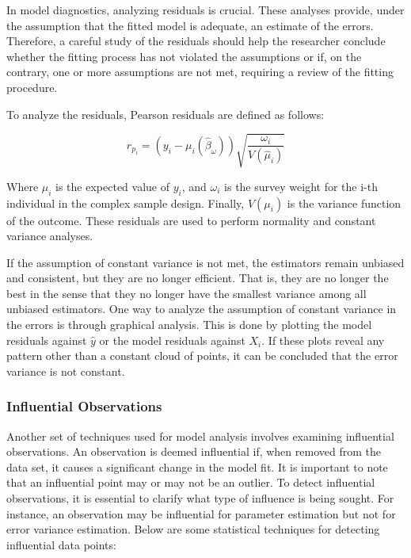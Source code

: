 \documentclass[
  12pt,
]{book}
\begin{document}
In model diagnostics, analyzing residuals is crucial. These analyses provide, under the assumption that the fitted model is adequate, an estimate of the errors. Therefore, a careful study of the residuals should help the researcher conclude whether the fitting process has not violated the assumptions or if, on the contrary, one or more assumptions are not met, requiring a review of the fitting procedure.

To analyze the residuals, Pearson residuals \citep{Heeringa_West_Berglund_2017} are defined as follows:

\[
r_{p_{i}}  =  \left(y_{i}-\mu_{i}\left(\hat{\beta}_{\omega}\right)\right)\sqrt{\frac{\omega_{i}}{V\left(\hat{\mu}_{i}\right)}}
\]

Where \(\mu_{i}\) is the expected value of \(y_{i}\), and \(\omega_{i}\) is the survey weight for the i-th individual in the complex sample design. Finally, \(V(\mu_{i})\) is the variance function of the outcome. These residuals are used to perform normality and constant variance analyses.

If the assumption of constant variance is not met, the estimators remain unbiased and consistent, but they are no longer efficient. That is, they are no longer the best in the sense that they no longer have the smallest variance among all unbiased estimators. One way to analyze the assumption of constant variance in the errors is through graphical analysis. This is done by plotting the model residuals against \(\hat{y}\) or the model residuals against \(X_{i}\). If these plots reveal any pattern other than a constant cloud of points, it can be concluded that the error variance is not constant.

\hypertarget{influential-observations}{%
\subsubsection{Influential Observations}\label{influential-observations}}

Another set of techniques used for model analysis involves examining influential observations. An observation is deemed influential if, when removed from the data set, it causes a significant change in the model fit. It is important to note that an influential point may or may not be an outlier. To detect influential observations, it is essential to clarify what type of influence is being sought. For instance, an observation may be influential for parameter estimation but not for error variance estimation. Below are some statistical techniques for detecting influential data points:
\end{document}
